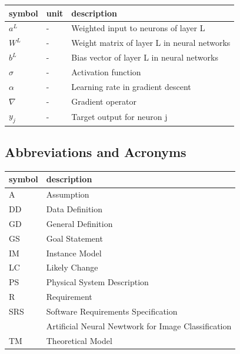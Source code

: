 \documentclass[12pt]{article}
\begin{document}
\renewcommand{\arraystretch}{1.2}
\noindent \begin{longtable*}{l l p{12cm}} \toprule
\textbf{symbol} & \textbf{unit} & \textbf{description}\\
\midrule 
$a^L$ & \si[per-mode=symbol] {-} & Weighted input to neurons of layer L
\\ 
$W^L$ & \si[per-mode=symbol] {-} & Weight matrix of layer L in neural networks
\\ 
$b^L$ & \si[per-mode=symbol] {-} & Bias vector of layer L in neural networks
\\ 
$\sigma$ & \si[per-mode=symbol] {-} & Activation function
\\ 
$\alpha$ & \si[per-mode=symbol] {-} & Learning rate in gradient descent
\\
$\nabla$ & \si[per-mode=symbol] {-} & Gradient operator
\\
$y_j$ & \si[per-mode=symbol] {-} & Target output for neuron j 
\\ 
\bottomrule
\end{longtable*}

\subsection{Abbreviations and Acronyms}

\renewcommand{\arraystretch}{1.2}
\begin{tabular}{l l} 
  \toprule		
  \textbf{symbol} & \textbf{description}\\
  \midrule 
  A & Assumption\\
  DD & Data Definition\\
  GD & General Definition\\
  GS & Goal Statement\\
  IM & Instance Model\\
  LC & Likely Change\\
  PS & Physical System Description\\
  R & Requirement\\
  SRS & Software Requirements Specification\\
  \progname{} & Artificial Neural Newtwork for Image Classification\\
  TM & Theoretical Model\\
  \bottomrule
\end{tabular}\\
\end{document}
